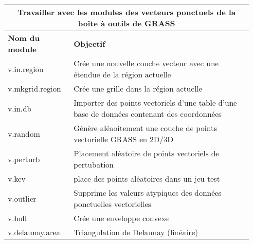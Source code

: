 \begin{table}[H]
\centering
 \begin{tabular}{|p{4cm}|p{10cm}|}
\hline \multicolumn{2}{|c|}{\textbf{Travailler avec les modules des vecteurs ponctuels de la boîte à outils de GRASS}} \\
  \hline \textbf{Nom du module} & \textbf{Objectif} \\
  \hline v.in.region & Crée une nouvelle couche vecteur avec une étendue de la région actuelle\\
  \hline v.mkgrid.region & Crée une grille dans la région actuelle\\
  \hline v.in.db & Importer des points vectoriels d'une table d'une base de données contenant des coordonnées\\
  \hline v.random & Génère aléaoitement une couche de points vectorielle GRASS en 2D/3D\\
  \hline v.perturb & Placement aléatoire de points vectoriels de pertubation \\   
  \hline v.kcv & place des points aléatoires dans un jeu test\\
  \hline v.outlier & Supprime les valeurs atypiques des données ponctuelles vectorielles\\
  \hline v.hull & Crée une enveloppe convexe\\
  \hline v.delaunay.area & Triangulation de Delaunay (linéaire) \\

\end{tabular}
\end{table}
